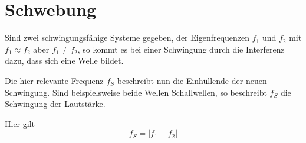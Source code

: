 \documentclass{article}
\begin{document}
\section{Schwebung}
\begin{minipage}{\dimexpr\linewidth-6.5cm} 
Sind zwei schwingungsfähige Systeme gegeben, der Eigenfrequenzen $f_1$ und $f_2$ mit ${f_1 \approx f_2}$ aber ${f_1 \ne f_2}$, so kommt es bei einer Schwingung durch die Interferenz dazu, dass sich eine Welle bildet.
 
Die hier relevante Frequenz $f_S$ beschreibt nun die Einhüllende der neuen Schwingung. Sind beispielsweise beide Wellen Schallwellen, so beschreibt $f_S$ die Schwingung der Lautstärke. \par \vspace{2pt}
 
\end{minipage}
\hfill 
\begin{minipage}{5.5cm}
 \center
\end{minipage}
 
\noindent Hier gilt
\[
 f_S = \vert f_1 - f_2 \vert
\] 
\end{document}
